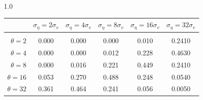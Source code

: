 \documentclass[12pt]{article}
\begin{document}
\begin{table}[h!]
\begin{subtable}{1.0\textwidth}
    \centering
\begin{tabular}{rccccc}
\hline  
            & \multicolumn{1}{l}{$\sigma_{\eta} =2\sigma_{v}$} & \multicolumn{1}{l}{$\sigma_{\eta} =4\sigma_{v}$} & \multicolumn{1}{l}{$\sigma_{\eta} =8\sigma_{v}$} & \multicolumn{1}{l}{$\sigma_{\eta} =16\sigma_{v}$} & \multicolumn{1}{l}{$\sigma_{\eta} =32\sigma_{v}$} \\ \hline  \vspace{-3mm} \\        
$\theta=2$  & 0.000                                             & 0.000                                             & 0.000                                             & 0.010                                              & 0.2410                                             \\ \hline
$\theta=4$  & 0.000                                             & 0.000                                             & 0.012                                             & 0.228                                              & 0.4630                                             \\ \hline
$\theta=8$  & 0.000                                             & 0.016                                             & 0.221                                             & 0.449                                              & 0.2410                                             \\ \hline
$\theta=16$ & 0.053                                             & 0.270                                             & 0.488                                             & 0.248                                              & 0.0540                                             \\ \hline
$\theta=32$ & 0.361                                             & 0.464                                             & 0.241                                             & 0.056                                              & 0.0050                                             \\ \hline
\end{tabular}
\end{subtable}


\end{table}
\end{document}
